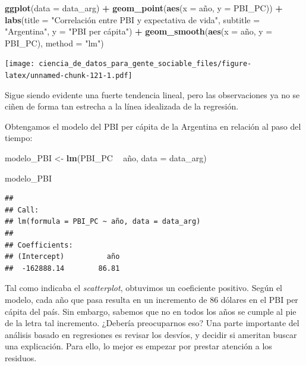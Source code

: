 \documentclass[]{book}
\newenvironment{Shaded}{\begin{snugshade}}{\end{snugshade}}
\newcommand{\KeywordTok}[1]{\textcolor[rgb]{0.13,0.29,0.53}{\textbf{#1}}}
\newcommand{\DataTypeTok}[1]{\textcolor[rgb]{0.13,0.29,0.53}{#1}}
\newcommand{\StringTok}[1]{\textcolor[rgb]{0.31,0.60,0.02}{#1}}
\newcommand{\OperatorTok}[1]{\textcolor[rgb]{0.81,0.36,0.00}{\textbf{#1}}}
\newcommand{\NormalTok}[1]{#1}
\begin{document}
\begin{Shaded}
\begin{Highlighting}[]
\KeywordTok{ggplot}\NormalTok{(}\DataTypeTok{data =}\NormalTok{ data_arg) }\OperatorTok{+}\StringTok{ }
\StringTok{    }\KeywordTok{geom_point}\NormalTok{(}\KeywordTok{aes}\NormalTok{(}\DataTypeTok{x =}\NormalTok{ año, }\DataTypeTok{y =}\NormalTok{ PBI_PC)) }\OperatorTok{+}
\StringTok{    }\KeywordTok{labs}\NormalTok{(}\DataTypeTok{title =} \StringTok{"Correlación entre PBI y expectativa de vida"}\NormalTok{,}
         \DataTypeTok{subtitle =} \StringTok{"Argentina"}\NormalTok{,}
         \DataTypeTok{y =} \StringTok{"PBI per cápita"}\NormalTok{) }\OperatorTok{+}
\StringTok{    }\KeywordTok{geom_smooth}\NormalTok{(}\KeywordTok{aes}\NormalTok{(}\DataTypeTok{x =}\NormalTok{ año, }\DataTypeTok{y =}\NormalTok{ PBI_PC), }\DataTypeTok{method =} \StringTok{"lm"}\NormalTok{)}
\end{Highlighting}
\end{Shaded}

\texttt{[image: ciencia\_de\_datos\_para\_gente\_sociable\_files/figure-latex/unnamed-chunk-121-1.pdf]}

Sigue siendo evidente una fuerte tendencia lineal, pero las
observaciones ya no se ciñen de forma tan estrecha a la línea idealizada
de la regresión.

Obtengamos el modelo del PBI per cápita de la Argentina en relación al
paso del tiempo:

\begin{Shaded}
\begin{Highlighting}[]
\NormalTok{modelo_PBI <-}\StringTok{ }\KeywordTok{lm}\NormalTok{(PBI_PC }\OperatorTok{~}\StringTok{ }\NormalTok{año, }\DataTypeTok{data =}\NormalTok{ data_arg)}

\NormalTok{modelo_PBI}
\end{Highlighting}
\end{Shaded}

\begin{verbatim}
## 
## Call:
## lm(formula = PBI_PC ~ año, data = data_arg)
## 
## Coefficients:
## (Intercept)          año  
##  -162888.14        86.81
\end{verbatim}

Tal como indicaba el \emph{scatterplot}, obtuvimos un coeficiente
positivo. Según el modelo, cada año que pasa resulta en un incremento de
86 dólares en el PBI per cápita del país. Sin embargo, sabemos que no en
todos los años se cumple al pie de la letra tal incremento. ¿Debería
preocuparnos eso? Una parte importante del análisis basado en
regresiones es revisar los desvíos, y decidir si ameritan buscar una
explicación. Para ello, lo mejor es empezar por prestar atención a los
residuos.
\end{document}
